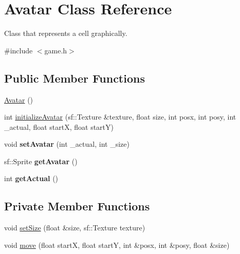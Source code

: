 \hypertarget{classAvatar}{}\section{Avatar Class Reference}
\label{classAvatar}


Class that represents a cell graphically.  




{\ttfamily \#include $<$game.\+h$>$}

\subsection*{Public Member Functions}
\begin{DoxyCompactItemize}
\item 
\hyperlink{classAvatar_a14b9eb31495b4f7db9d52c64b78f40b0}{Avatar} ()
\item 
int \hyperlink{classAvatar_a266b3ed1e38b77d28a0a7cabc7ca5ae2}{initialize\+Avatar} (sf\+::\+Texture \&texture, float size, int posx, int posy, int \+\_\+actual, float startX, float startY)
\item 
void {\bfseries set\+Avatar} (int \+\_\+actual, int \+\_\+size)\hypertarget{classAvatar_a7befb8bda764e5cd0cc04a3a4c2c5145}{}\label{classAvatar_a7befb8bda764e5cd0cc04a3a4c2c5145}

\item 
sf\+::\+Sprite {\bfseries get\+Avatar} ()\hypertarget{classAvatar_ac5fadc3a5a9c03ced147e34553cbce53}{}\label{classAvatar_ac5fadc3a5a9c03ced147e34553cbce53}

\item 
int {\bfseries get\+Actual} ()\hypertarget{classAvatar_adcbefe8ab616aef752824f4dd6e86cb1}{}\label{classAvatar_adcbefe8ab616aef752824f4dd6e86cb1}

\end{DoxyCompactItemize}
\subsection*{Private Member Functions}
\begin{DoxyCompactItemize}
\item 
void \hyperlink{classAvatar_aa4cff0f42d3cd638d582b54373947ad7}{set\+Size} (float \&size, sf\+::\+Texture texture)
\item 
void \hyperlink{classAvatar_aaa3415318ec9f04c0b8a765c78faf4e5}{move} (float startX, float startY, int \&posx, int \&posy, float \&size)
\end{DoxyCompactItemize}
